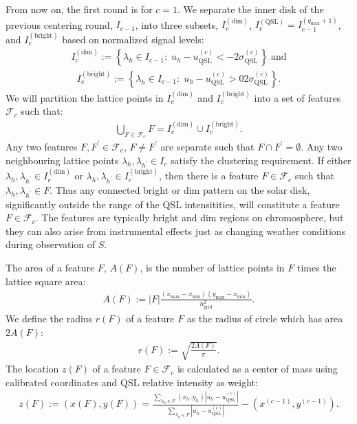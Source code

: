 \documentclass{aa}
\newcommand{\eqnl}[2]{\begin{eqnarray}\label{#1}#2\end{eqnarray}}
\newcommand{\s}[2]{{#1}_{\mathrm{#2}}}
\begin{document}
  From now on, the first round is for $c=1$. We separate the inner disk of the previous centering round, $I_{c-1}$, into three subsets, 
  $I_c^{(\mathrm{dim})}$, $I_c^{(\mathrm{QSL})} = I_{c-1}^{(\s{q}{max}+1)}$, and $I_c^{(\mathrm{bright})}$ based on 
  normalized signal levels:
  \eqnl{calib_features_dim}{
  I_c^{(\mathrm{dim})} := \left\{ \lambda_h \in I_{c-1} :\; u_h - \s{u}{QSL}^{(c)} < -2 \s{\sigma}{QSL}^{(c)} \right\} \; \text{and}
  } 
  \eqnl{calib_features_bright}{
  I_c^{(\mathrm{bright})} := \left\{ \lambda_h \in I_{c-1} :\; u_h - \s{u}{QSL}^{(c)} > 02 \s{\sigma}{QSL}^{(c)} \right\} \text{.}
  } 
  We will partition the lattice points in $I_c^{(\mathrm{dim})}$ and $I_c^{(\mathrm{bright})}$ into a set of features $\mathcal{F}_c$ such that:
  \eqnl{calib_features2}{
  \bigcup \limits_{F \in \mathcal{F}_c} F = I_c^{(\mathrm{dim})} \cup I_c^{(\mathrm{bright})} \text{.}
  }
  Any two features $F, F^{\prime} \in \mathcal{F}_c$, $F \ne F^{\prime}$ are separate such that $F \cap F^{\prime} = 
  \emptyset$. Any two neighbouring lattice points $\lambda_h, \lambda_{h^{\prime}} \in I_c$ satisfy the clustering 
  requirement. If either $\lambda_h,\lambda_{h^{\prime}} \in I_c^{(\mathrm{dim})}$ or $\lambda_h,\lambda_{h^{\prime}} 
  \in I_c^{(\mathrm{bright})}$, then there is a feature $F \in \mathcal{F}_c$ such that $\lambda_h,\lambda_{h^{\prime}} 
  \in F$. Thus any connected bright or dim pattern on the solar disk, significantly outside the range of the QSL 
  intensitities, will constitute a feature $F \in \mathcal{F}_c$. The features are typically bright and dim regions on 
  chromosphere, but they can also arise from instrumental effects just as changing weather conditions during observation 
  of $S$.
  
  The area of a feature $F$, $A(F)$, is the number of lattice points in $F$ times the lattice square area:
  \eqnl{calib_features3}{
  A(F) := |F| \frac{\left( \s{x}{max} - \s{x}{min} \right) \left( \s{y}{max} - \s{x}{min} \right)}{\s{n}{grid}^2} \text{.}
  }
  We define the radius $r(F)$ of a feature $F$ as the radius of circle which has area $2 A(F)$:
  \eqnl{calib_features4}{
  r(F) := \sqrt{\frac{2 A(F)}{\pi}} \text{.}
  }
  The location $z(F)$ of a feature $F \in \mathcal{F}_c$ is calculated as a center of mass using calibrated coordinates and QSL relative intensity as weight:
  \eqnl{calib_features5}{
  z(F) := \left( x(F), y(F) \right) = \frac{\sum \limits_{\lambda_h \in F} \left( x_h, y_h \right) \left| u_h - \s{u}{QSL}^{(c)} \right|}{\sum \limits_{\lambda_h \in F} \left| u_h - \s{u}{QSL}^{(c)} \right|} - \left( x^{(c-1)}, y^{(c-1)} \right) \text{.}
  }
\end{document}

